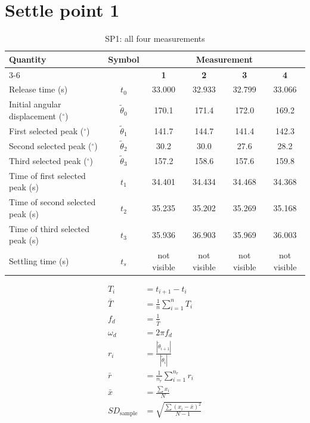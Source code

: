 \documentclass[11pt,a4paper]{article}
\begin{document}
\section{Settle point 1}
\begin{table}[H]
    \centering
    \caption{SP1: all four measurements}
    \label{tab:sp1_all}
    \renewcommand{\arraystretch}{1.6}
    \begin{tabular}{|l|c|c|c|c|c|}
        \hline
        \textbf{Quantity} & \textbf{Symbol} & \multicolumn{4}{c|}{\textbf{Measurement}} \\
        \cline{3-6}
         & & \textbf{1} & \textbf{2} & \textbf{3} & \textbf{4} \\
        \hline
        Release time (s)                        & $t_0$              & 33.000 & 32.933 & 32.799 & 33.066 \\ \hline
        Initial angular displacement ($^\circ$) & $\tilde{\theta}_0$ & 170.1  & 171.4  & 172.0  & 169.2  \\ \hline
        First selected peak ($^\circ$)          & $\tilde{\theta}_1$ & 141.7  & 144.7  & 141.4  & 142.3  \\ \hline
        Second selected peak ($^\circ$)         & $\tilde{\theta}_2$ & 30.2   & 30.0   & 27.6   & 28.2   \\ \hline
        Third selected peak ($^\circ$)          & $\tilde{\theta}_3$ & 157.2  & 158.6  & 157.6  & 159.8  \\ \hline
        Time of first selected peak (s)         & $t_1$              & 34.401 & 34.434 & 34.468 & 34.368 \\ \hline
        Time of second selected peak (s)        & $t_2$              & 35.235 & 35.202 & 35.269 & 35.168 \\ \hline
        Time of third selected peak (s)         & $t_3$              & 35.936 & 36.903 & 35.969 & 36.003 \\ \hline
        Settling time (s)                       & $t_s$              & not visible & not visible & not visible  &    not visible    \\ \hline
    \end{tabular}
\end{table}


\begin{align}
T_i &= t_{i+1} - t_i \label{eq:Ti} \\
\bar{T} &= \frac{1}{n}\sum_{i=1}^{n} T_i \label{eq:Tmean} \\
f_d &= \frac{1}{\bar{T}} \label{eq:fd} \\
\omega_d &= 2\pi f_d \label{eq:wd} \\
r_i &= \frac{|\tilde{\theta}_{i+1}|}{|\tilde{\theta}_i|} \label{eq:ri} \\
\bar{r} &= \frac{1}{n_r}\sum_{i=1}^{n_r} r_i \label{eq:rmean} \\
\bar{x} &= \frac{\sum x_i}{N} \label{eq:mean} \\
SD_\text{sample} &= \sqrt{\frac{\sum \left(x_i-\bar{x}\right)^2}{N-1}} \label{eq:sd}
\end{align}
\end{document}
